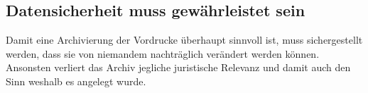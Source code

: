 \subsection{Datensicherheit muss gewährleistet sein}
Damit eine Archivierung der Vordrucke überhaupt sinnvoll ist, muss sichergestellt werden, dass sie von niemandem  
nachträglich verändert werden können. Ansonsten verliert das Archiv jegliche juristische Relevanz und damit auch den  
Sinn weshalb es angelegt wurde.  